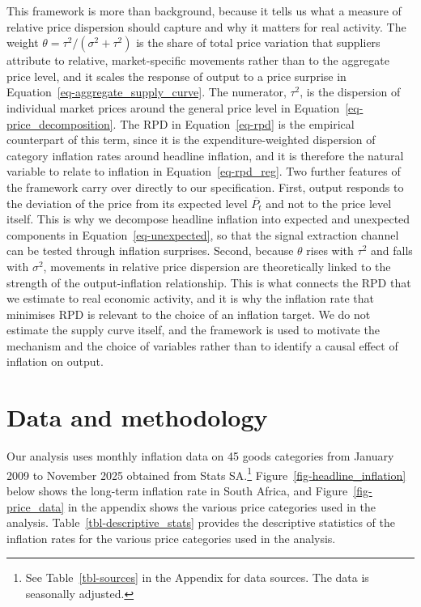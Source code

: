 \documentclass[
  letterpaper,
  DIV=11,
  numbers=noendperiod]{scrartcl}
\begin{document}
This framework is more than background, because it tells us what a
measure of relative price dispersion should capture and why it matters
for real activity. The weight \(\theta = \tau^2/(\sigma^2 + \tau^2)\) is
the share of total price variation that suppliers attribute to relative,
market-specific movements rather than to the aggregate price level, and
it scales the response of output to a price surprise in
Equation~\ref{eq-aggregate_supply_curve}. The numerator, \(\tau^2\), is
the dispersion of individual market prices around the general price
level in Equation~\ref{eq-price_decomposition}. The RPD in
Equation~\ref{eq-rpd} is the empirical counterpart of this term, since
it is the expenditure-weighted dispersion of category inflation rates
around headline inflation, and it is therefore the natural variable to
relate to inflation in Equation~\ref{eq-rpd_reg}. Two further features
of the framework carry over directly to our specification. First, output
responds to the deviation of the price from its expected level
\(\overline{P_t}\) and not to the price level itself. This is why we
decompose headline inflation into expected and unexpected components in
Equation~\ref{eq-unexpected}, so that the signal extraction channel can
be tested through inflation surprises. Second, because \(\theta\) rises
with \(\tau^2\) and falls with \(\sigma^2\), movements in relative price
dispersion are theoretically linked to the strength of the
output-inflation relationship. This is what connects the RPD that we
estimate to real economic activity, and it is why the inflation rate
that minimises RPD is relevant to the choice of an inflation target. We
do not estimate the supply curve itself, and the framework is used to
motivate the mechanism and the choice of variables rather than to
identify a causal effect of inflation on output.

\section{Data and methodology}\label{data-and-methodology}

Our analysis uses monthly inflation data on 45 goods categories from
January 2009 to November 2025 obtained from Stats SA.\footnote{See
  Table~\ref{tbl-sources} in the Appendix for data sources. The data is
  seasonally adjusted.} Figure~\ref{fig-headline_inflation} below shows
the long-term inflation rate in South Africa, and
Figure~\ref{fig-price_data} in the appendix shows the various price
categories used in the analysis. Table~\ref{tbl-descriptive_stats}
provides the descriptive statistics of the inflation rates for the
various price categories used in the analysis.
\end{document}
